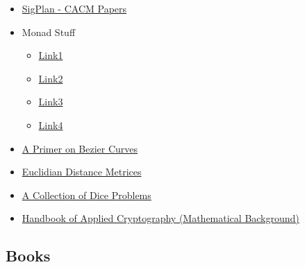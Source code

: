 \begin{itemize}
	\item \href{http://www.sigplan.org/Newsletters/CACM/Papers/}{SigPlan - CACM
	Papers}

	\item Monad Stuff

	\begin{itemize}
		\item
		\href{http://bartoszmilewski.com/2015/05/11/using-monads-in-c-to-solve-constraints-1-the-list-monad/}{Link1}
		\item
		\href{http://blog.jle.im/entry/unique-sample-drawing-searches-with-list-and-statet}{Link2}
		\item
		\href{http://www.berniepope.id.au/docs/scala_monads.pdf}{Link3}
		\item
		\href{http://james-iry.blogspot.co.at/2007/10/monads-are-elephants-part-3.html}{Link4}
	\end{itemize}

	\item \href{https://pomax.github.io/bezierinfo/}{A Primer on Bezier Curves}

	\item \href{files/1502.07541.pdf}{Euclidian Distance Metrices}

	\item \href{dice1.pdf}{A Collection of Dice Problems}

	\item \href{Handbook of Applied Cryptography - Chapter02.pdf}{Handbook of Applied Cryptography (Mathematical Background)}

\end{itemize}

\subsection{Books}

